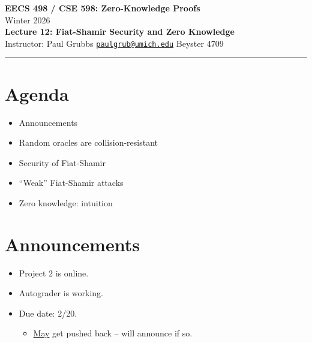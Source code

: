 \documentclass[11pt]{article}
\begin{document}
\begin{center}
  {\LARGE \textbf{EECS 498 / CSE 598: Zero-Knowledge Proofs}}\\[6pt]
  {\large Winter 2026}\\[4pt]
  {\large \textbf{Lecture 12: Fiat-Shamir Security and Zero Knowledge}}\\[4pt]
  {\large Instructor: Paul Grubbs \quad
    \href{mailto:paulgrub@umich.edu}{\texttt{paulgrub@umich.edu}} \quad
    Beyster 4709}
\end{center}

\vspace{0.5em}
\hrule
\vspace{1em}

\section*{Agenda}
\begin{itemize}
  \item Announcements
  \item Random oracles are collision-resistant
  \item Security of Fiat-Shamir
  \item ``Weak'' Fiat-Shamir attacks
  \item Zero knowledge: intuition
\end{itemize}

\newpage

\section{Announcements}

\begin{itemize}
  \item Project 2 is online.
  \item Autograder is working.
  \item Due date: 2/20.
        \begin{itemize}
          \item \underline{May} get pushed back -- will announce if so.
        \end{itemize}
\end{itemize}
\end{document}
